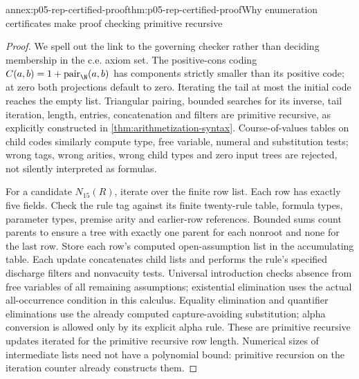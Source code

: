 \begin{annexitem}{annex:p05-rep-certified-proof}{thm:p05-rep-certified-proof}{Why enumeration certificates make proof checking primitive recursive}
\begin{proof}
We spell out the link to the governing checker rather than deciding
membership in the c.e. axiom set. The positive-cons coding
\(C(a,b)=1+\operatorname{pair}_{\N}(a,b)\) has components strictly
smaller than its positive code; at zero both projections default to zero.
Iterating the tail at most the initial code reaches the empty list.
Triangular pairing, bounded searches for its inverse, tail iteration,
length, entries, concatenation and filters are primitive recursive, as
explicitly constructed in \cref{thm:arithmetization-syntax}.
Course-of-values tables on child codes similarly compute type, free
variable, numeral and substitution tests; wrong tags, wrong arities,
wrong child types and zero input trees are rejected, not silently
interpreted as formulas.

For a candidate \(N_{15}(R)\), iterate over the finite row list. Each
row has exactly five fields. Check the rule tag against its finite
twenty-rule table, formula types, parameter types, premise arity and
earlier-row references. Bounded sums count parents to ensure a tree with
exactly one parent for each nonroot and none for the last row. Store each
row's computed open-assumption list in the accumulating table. Each
update concatenates child lists and performs the rule's specified
discharge filters and nonvacuity tests. Universal introduction checks
absence from free variables of all remaining assumptions; existential
elimination uses the actual all-occurrence condition in this calculus.
Equality elimination and quantifier eliminations use the already computed
capture-avoiding substitution; alpha conversion is allowed only by its
explicit alpha rule. These are primitive recursive updates iterated for
the primitive recursive row length. Numerical sizes of intermediate
lists need not have a polynomial bound: primitive recursion on the
iteration counter already constructs them.


\end{proof}
\end{annexitem}

